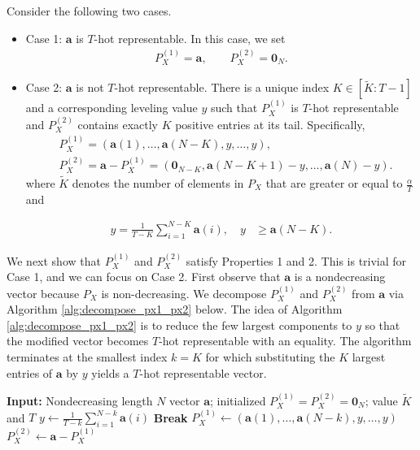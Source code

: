 \documentclass[11pt,letterpaper]{article}
\begin{document}
    Consider the following two cases.
    \begin{itemize}
        \item Case 1: $\boldsymbol{a}$ is $T$-hot representable. In this case, we set 
            \begin{align}
                P_X^{(1)} = \boldsymbol{a},\qquad P_X^{(2)} = \mathbf{0}_N.
            \end{align} 
        \item Case 2: $\boldsymbol{a}$ is not $T$-hot representable.          There is a unique index $K \in [\tilde{K}:T-1]$ and a corresponding leveling value $y$ such that $P_X^{(1)}$ is $T$-hot representable and $P_X^{(2)}$ contains exactly $K$ positive entries at its tail. Specifically,
            \begin{align}
                & P_X^{(1)} = (\boldsymbol{a}(1), \dots, \boldsymbol{a}(N-K), y, \dots, y), \\
                & P_X^{(2)} = \boldsymbol{a} - P_X^{(1)} = (\mathbf{0}_{N-K}, \boldsymbol{a}(N-K+1)-y, \dots, \boldsymbol{a}(N)-y).
            \end{align}
            where $\tilde{K}$ denotes the number of elements in $P_X$ that are greater or equal to $\tfrac{\alpha}{T}$ and
            
            \begin{align*}
                y = \frac{1}{T-K} \sum_{i=1}^{N-K} \boldsymbol{a}(i), \quad  y & \geq \boldsymbol{a}({N-K}).
            \end{align*}
    \end{itemize}
We next show that $P_X^{(1)}$ and $P_X^{(2)}$ satisfy Properties 1 and 2. This is trivial for Case 1, and we can focus on Case 2. 
First observe that $\boldsymbol{a}$ is a nondecreasing vector because $P_X$ is non-decreasing. We decompose $P_X^{(1)}$ and $P_X^{(2)}$ from $\boldsymbol{a}$  via Algorithm \ref{alg:decompose_px1_px2} below. The idea of Algorithm \ref{alg:decompose_px1_px2} is to reduce the few largest components to $y$ so that the modified vector becomes $T$-hot representable with an equality. The algorithm terminates at the smallest index $k = K$ for which substituting the $K$ largest entries of $\boldsymbol{a}$ by $y$ yields a $T$-hot representable vector.

\begin{algorithm}[h]
\caption{$T$-hot representable extraction from $\boldsymbol{a}$}
\label{alg:decompose_px1_px2}
\begin{algorithmic}[1]
\State \textbf{Input:} Nondecreasing length $N$ vector $\boldsymbol{a}$; initialized $P_X^{(1)} = P_X^{(2)} = \mathbf{0}_N$; value $\tilde{K}$ and $T$
    \State $y \gets \tfrac{1}{T-k}\sum_{i=1}^{N-k}\boldsymbol{a}(i)$
        \State \textbf{Break}
    \EndIf
\EndFor
\State $P_X^{(1)} \gets (\boldsymbol{a}(1), \dots, \boldsymbol{a}(N-k), y, \dots,y)$
\State $P_X^{(2)} \gets \boldsymbol{a}-P_X^{(1)}$ 
\end{algorithmic}
\end{algorithm}
\end{document}
